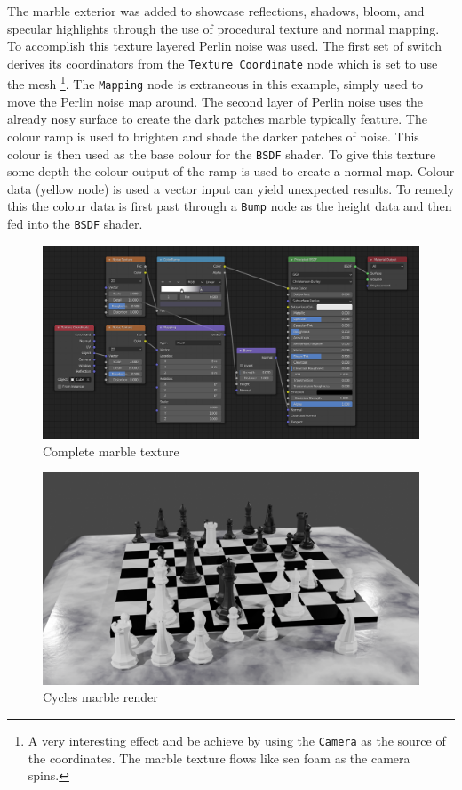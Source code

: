 \documentclass[11pt]{article}
\begin{document}
The marble exterior was added to showcase reflections, shadows, bloom, and specular
highlights through the use of procedural texture and normal mapping.\\

To accomplish this texture layered Perlin noise was used. The first set of
switch derives its coordinators from the \texttt{Texture Coordinate} node which is set
to use the mesh \footnote{A very interesting effect and be achieve by using the \texttt{Camera} as the
source of the coordinates. The marble texture flows like sea foam as the camera spins.}. The \texttt{Mapping} node is extraneous in this example, simply
used to move the Perlin noise map around. The second layer of Perlin noise uses
the already nosy surface to create the dark patches marble typically feature.
The colour ramp is used to brighten and shade the darker patches of noise. This
colour is then used as the base colour for the \texttt{BSDF} shader. To give this
texture some depth the colour output of the ramp is used to create a normal map.
Colour data (yellow node) is used a vector input can yield unexpected results.
To remedy this the colour data is first past through a \texttt{Bump} node as the height
data and then fed into the \texttt{BSDF} shader.
\begin{figure}[htbp]
\centering
\includegraphics[width=\textwidth]{Images/marbletextire.png}
\caption{\label{marble-texture}Complete marble texture}
\end{figure}

\begin{figure}[htbp]
\centering
\includegraphics[width=\textwidth]{Images/Marble cycles.png}
\caption{Cycles marble render}
\end{figure}
\end{document}
